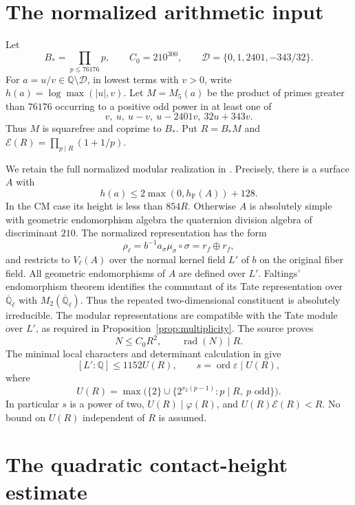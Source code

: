 \documentclass[11pt,a4paper]{article}
\newcommand{\Q}{\mathbb Q}
\newcommand{\hF}{h_{\mathrm F}}
\DeclareMathOperator{\ord}{ord}
\begin{document}
\section{The normalized arithmetic input}

Let
\[
 B_*=\prod_{p\le76176}p,\qquad C_0=210^{300},\qquad
 \mathcal D=\{0,1,2401,-343/32\}.
\]
For \(a=u/v\in\Q\setminus\mathcal D\), in lowest terms with \(v>0\),
write \(h(a)=\log\max(|u|,v)\). Let \(M=M_5(a)\) be the product
of primes greater than \(76176\) occurring to a positive odd
power in at least one of
\[
                 v,\ u,\ u-v,\ u-2401v,\ 32u+343v.
\]
Thus \(M\) is squarefree and coprime to \(B_*\). Put \(R=B_*M\)
and \(\mathcal E(R)=\prod_{p\mid R}(1+1/p)\).

We retain the full normalized modular realization in
\cite[proof of \texttt{o8-height}, equations (LR2)--(LR5)]{Source}.
Precisely, there is a surface \(A\) with
\[
                  h(a)\le2\max(0,\hF(A))+128.
\]
In the CM case its height is less than \(854R\).
Otherwise \(A\) is absolutely simple with geometric endomorphism
algebra the quaternion division algebra of discriminant \(210\).
The normalized representation has the form
\[
 \rho_\ell=b^{-1}a_\sigma\mu_\sigma\circ\sigma
              =r_f\oplus r_f,
\]
and restricts to \(V_\ell(A)\) over the normal kernel field \(L'\)
of \(b\) on the original fiber field. All geometric endomorphisms of $A$ are defined over $L'$. Faltings'
endomorphism theorem identifies the commutant of its Tate representation
over $\overline{\Q}_\ell$ with $M_2(\overline{\Q}_\ell)$. Thus the
repeated two-dimensional constituent is absolutely irreducible. The
modular representations are compatible with the Tate module over $L'$,
as required in Proposition~\ref{prop:multiplicity}. The source proves
\[
 N\le C_0R^2,\qquad \operatorname{rad}(N)\mid R.
\]
The minimal local characters and determinant calculation in
\cite[Sections~1--2]{Characters} give
\[
 [L':\Q]\le1152U(R),\qquad s=\ord\varepsilon\mid U(R),
\]
where
\[
 U(R)=\max\bigl(\{2\}\cup
             \{2^{v_2(p-1)}:p\mid R,\ p\text{ odd}\}\bigr).
\]
In particular \(s\) is a power of two,
\(U(R)\mid\varphi(R)\), and \(U(R)\mathcal E(R)<R\).
No bound on \(U(R)\) independent of \(R\) is assumed.

\section{The quadratic contact-height estimate}
\end{document}
